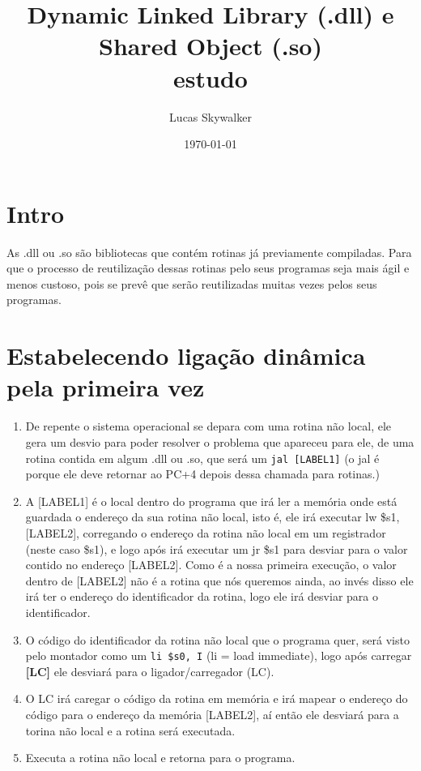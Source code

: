 \documentclass{article}
\author {
  Lucas Skywalker
}
\title {
  Dynamic Linked Library (.dll) e Shared Object (.so)\\
  {
    \small estudo
  }
}
\date{\today}
\begin{document}
\maketitle

\section{Intro}
As .dll ou .so são bibliotecas que contém rotinas já previamente compiladas.
Para que o processo de reutilização dessas rotinas pelo seus programas seja mais
ágil e menos custoso, pois se prevê que serão reutilizadas muitas vezes pelos
seus programas.

\section{Estabelecendo ligação dinâmica pela primeira vez}

  \begin{enumerate}
    \item De repente o sistema operacional se depara com uma rotina não local,
    ele gera um desvio para poder resolver o problema que apareceu para ele, de
    uma rotina contida em algum .dll ou .so, que será um \verb|jal [LABEL1]| (o
    jal é porque ele deve retornar ao PC+4 depois dessa chamada para rotinas.)

    \item A [LABEL1] é o local dentro do programa que irá ler a memória onde
    está guardada o endereço da sua rotina não local, isto é, ele irá executar
    lw \$s1, [LABEL2], corregando o endereço da rotina não local em um
    registrador (neste caso \$s1), e logo após irá executar um jr \$s1 para
    desviar para o valor contido no endereço [LABEL2]. Como é a nossa primeira
    execução, o valor dentro de [LABEL2] não é a rotina que nós queremos ainda,
    ao invés disso ele irá ter o endereço do identificador da rotina, logo ele
    irá desviar para o identificador.

    \item O código do identificador da rotina não local que o programa quer,
    será visto pelo montador como um \verb|li $s0, I| (li = load immediate),
    logo após carregar \textbf{[LC]} ele desviará para o ligador/carregador
    (LC).

    \item O LC irá caregar o código da rotina em memória e irá mapear o endereço
    do código para o endereço da memória [LABEL2], aí então ele desviará para a
    torina não local e a rotina será executada.

    \item Executa a rotina não local e retorna para o programa.
  \end{enumerate}
\end{document}
